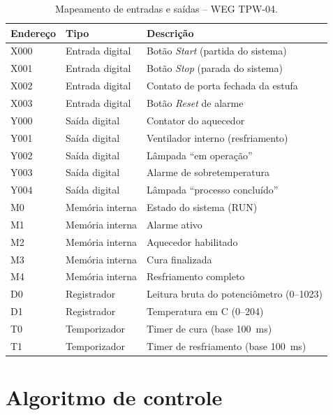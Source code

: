 \documentclass[
  12pt,
  openright,
  oneside,
  a4paper,
  chapter=TITLE,
  section=TITLE,
  brazilian
]{abntex2}
\begin{document}
\begin{table}[htbp]
\centering
\caption{Mapeamento de entradas e sa\'{i}das -- WEG TPW-04.}
\label{tab:io_tpw}
\begin{tabular}{llp{7.5cm}}
\toprule
\textbf{Endere\c{c}o} & \textbf{Tipo} & \textbf{Descri\c{c}\~{a}o} \\
\midrule
X000 & Entrada digital  & Bot\~{a}o \textit{Start} (partida do sistema) \\
X001 & Entrada digital  & Bot\~{a}o \textit{Stop} (parada do sistema) \\
X002 & Entrada digital  & Contato de porta fechada da estufa \\
X003 & Entrada digital  & Bot\~{a}o \textit{Reset} de alarme \\
Y000 & Sa\'{i}da digital    & Contator do aquecedor \\
Y001 & Sa\'{i}da digital    & Ventilador interno (resfriamento) \\
Y002 & Sa\'{i}da digital    & L\^{a}mpada ``em opera\c{c}\~{a}o'' \\
Y003 & Sa\'{i}da digital    & Alarme de sobretemperatura \\
Y004 & Sa\'{i}da digital    & L\^{a}mpada ``processo conclu\'{i}do'' \\
\midrule
M0   & Mem\'{o}ria interna   & Estado do sistema (RUN) \\
M1   & Mem\'{o}ria interna   & Alarme ativo \\
M2   & Mem\'{o}ria interna   & Aquecedor habilitado \\
M3   & Mem\'{o}ria interna   & Cura finalizada \\
M4   & Mem\'{o}ria interna   & Resfriamento completo \\
D0   & Registrador       & Leitura bruta do potenci\^{o}metro (0--1023) \\
D1   & Registrador       & Temperatura em \textdegree{}C (0--204) \\
T0   & Temporizador      & Timer de cura (base 100~ms) \\
T1   & Temporizador      & Timer de resfriamento (base 100~ms) \\
\bottomrule
\end{tabular}
\end{table}

\section{Algoritmo de controle}
\end{document}
